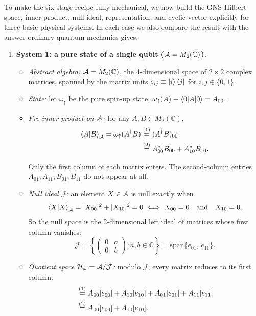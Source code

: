 \begin{workedexamplebox}
To make the six-stage recipe fully mechanical, we now build the GNS Hilbert space, inner product, null ideal,
representation, and cyclic vector explicitly for three basic physical systems. In each case we also compare
the result with the answer ordinary quantum mechanics gives.

\begin{enumerate}[leftmargin=*]
\item \textbf{System 1: a pure state of a single qubit ($\mathcal{A} = M_2(\mathbb{C})$).}
\begin{itemize}[leftmargin=*]
\item \emph{Abstract algebra:} $\mathcal{A} = M_2(\mathbb{C})$, the 4-dimensional space of $2\times2$ complex
matrices, spanned by the matrix units $e_{ij} \equiv \ket{i}\bra{j}$ for $i,j \in \{0,1\}$.
\item \emph{State:} let $\omega_\uparrow$ be the pure spin-up state, $\omega_\uparrow(A) \equiv
\braket{0|A|0} = A_{00}$.
\item \emph{Pre-inner product on $\mathcal{A}$:} for any $A, B \in M_2(\mathbb{C})$,
\begin{align}
\braket{A|B}_{\mathcal{A}} = \omega_\uparrow(A^\dagger B)
&\overset{(1)}{=} (A^\dagger B)_{00} \notag\\
&\overset{(2)}{=} A_{00}^* B_{00} + A_{10}^* B_{10} . \notag
\end{align}
\quad
{}

Only the first column of each matrix enters. The second-column entries $A_{01}, A_{11}, B_{01}, B_{11}$ do not
appear at all.
\item \emph{Null ideal $\mathcal{J}$:} an element $X \in \mathcal{A}$ is null exactly when
\[
\braket{X|X}_{\mathcal{A}} = |X_{00}|^2 + |X_{10}|^2 = 0 \iff X_{00} = 0 \quad \text{and} \quad X_{10} = 0 .
\]
So the null space is the 2-dimensional left ideal of matrices whose first column vanishes:
\[
\mathcal{J} = \left\{ \begin{pmatrix} 0 & a \\ 0 & b \end{pmatrix} : a,b \in \mathbb{C} \right\} = \mathrm{span}\{e_{01}, \, e_{11}\} .
\]
\item \emph{Quotient space $\mathcal{H}_\omega = \mathcal{A}/\mathcal{J}$:} modulo $\mathcal{J}$, every matrix reduces to its
first column:
\begin{align}
[A] &\eqstep{1} A_{00} [e_{00}] + A_{10} [e_{10}] + A_{01}[e_{01}] + A_{11}[e_{11}] \notag\\
&\eqstep{2} A_{00}[e_{00}] + A_{10}[e_{10}] . \notag
\end{align}
\quad
{}


\end{itemize}
\end{enumerate}
\end{workedexamplebox}
